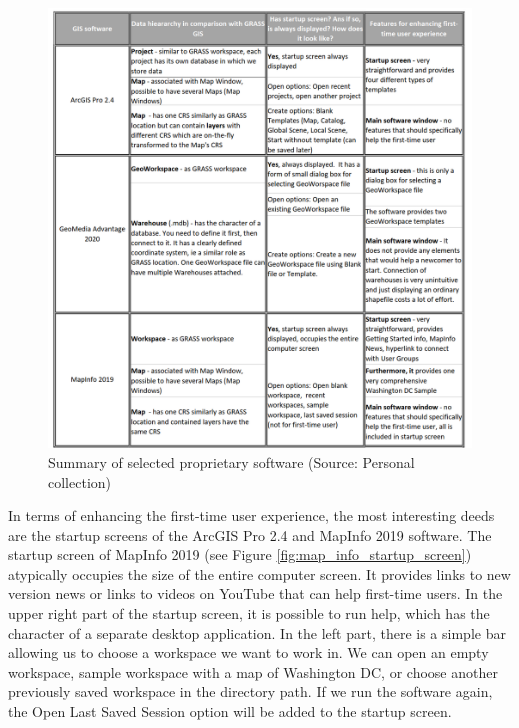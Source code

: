 \documentclass[a4paper,10pt,twoside]{article}
\begin{document}
\vspace{0.3cm}
\begin{figure}[hbt!] 
\begin{center}
\includegraphics[width=16.5cm]{../pictures/proprietary_software.png}
\caption[Summary of selected proprietary software]{Summary of selected proprietary software (Source: Personal collection)}
\label{fig:proprietary_software}
\end{center}
\end{figure}

\noindent In terms of enhancing the first-time user experience, the most interesting deeds are the startup screens of the ArcGIS Pro 2.4 and MapInfo 2019 software. The startup screen of MapInfo 2019 (see Figure \ref{fig:map_info_startup_screen}) atypically occupies the size of the entire computer screen. It provides links to new version news or links to videos on YouTube that can help first-time users. In the upper right part of the startup screen, it is possible to run help, which has the character of a separate desktop application. In the left part, there is a simple bar allowing us to choose a workspace we want to work in. We can open an empty workspace, sample workspace with a map of Washington DC, or choose another previously saved workspace in the directory path. If we run the software again, the Open Last Saved Session option will be added to the startup screen.
\end{document}
